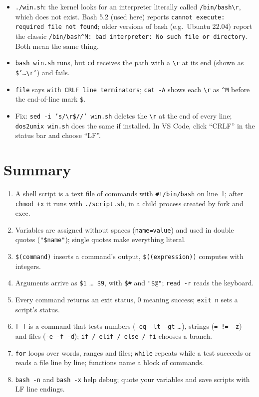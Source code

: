 \documentclass[11pt,a4paper]{article}
\newcommand{\cmd}[1]{\texttt{#1}}
\begin{document}
\begin{itemize}
  \item \texttt{./win.sh}: the kernel looks for an interpreter literally called \texttt{/bin/bash\textbackslash r}, which does not exist. Bash 5.2 (used here) reports \texttt{cannot execute: required file not found}; older versions of bash (e.g.\ Ubuntu 22.04) report the classic \texttt{/bin/bash\^{}M: bad interpreter: No such file or directory}. Both mean the same thing.
  \item \texttt{bash win.sh} runs, but \cmd{cd} receives the path with a \texttt{\textbackslash r} at its end (shown as \texttt{\$'\ldots\textbackslash r'}) and fails.
  \item \cmd{file} says \texttt{with CRLF line terminators}; \cmd{cat -A} shows each \texttt{\textbackslash r} as \texttt{\^{}M} before the end-of-line mark \texttt{\$}.
  \item Fix: \cmd{sed -i 's/\textbackslash r\$//' win.sh} deletes the \texttt{\textbackslash r} at the end of every line; \cmd{dos2unix win.sh} does the same if installed. In VS Code, click “CRLF” in the status bar and choose “LF”.
\end{itemize}

\section{Summary}

\begin{keyidea}
\begin{enumerate}[leftmargin=1.4em]
  \item A shell script is a text file of commands with \texttt{\#!/bin/bash} on line~1; after \cmd{chmod +x} it runs with \texttt{./script.sh}, in a child process created by fork and exec.
  \item Variables are assigned without spaces (\texttt{name=value}) and used in double quotes (\texttt{"\$name"}); single quotes make everything literal.
  \item \texttt{\$(command)} inserts a command's output, \texttt{\$((expression))} computes with integers.
  \item Arguments arrive as \texttt{\$1} \ldots\ \texttt{\$9}, with \texttt{\$\#} and \texttt{"\$@"}; \texttt{read -r} reads the keyboard.
  \item Every command returns an exit status, $0$ meaning success; \texttt{exit n} sets a script's status.
  \item \texttt{[ ]} is a command that tests numbers (\texttt{-eq -lt -gt} \ldots), strings (\texttt{= != -z}) and files (\texttt{-e -f -d}); \texttt{if / elif / else / fi} chooses a branch.
  \item \texttt{for} loops over words, ranges and files; \texttt{while} repeats while a test succeeds or reads a file line by line; functions name a block of commands.
  \item \texttt{bash -n} and \texttt{bash -x} help debug; quote your variables and save scripts with LF line endings.
\end{enumerate}
\end{keyidea}
\end{document}
